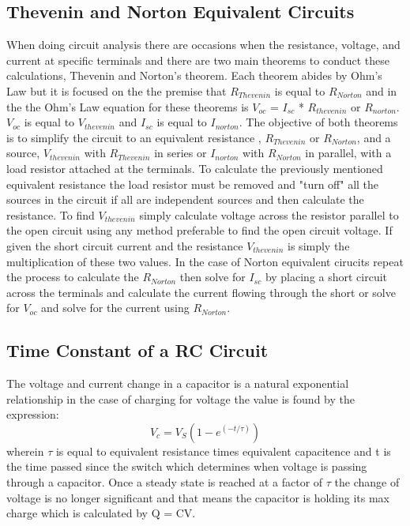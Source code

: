 \documentclass[a4paper]{article}
\begin{document}
\subsection{Thevenin and Norton Equivalent Circuits}
When doing circuit analysis there are occasions when the resistance, voltage, and current at specific terminals and there are two main theorems to conduct these calculations, Thevenin and Norton's theorem. Each theorem abides by Ohm's Law but it is 
focused on the the premise that $R_{Thevenin}$ is equal to $R_{Norton}$ and in the the Ohm's Law equation for these theorems is $V_{oc}$ = $I_{sc}$ * $R_{thevenin}$ or $R_{norton}$. $V_{oc}$ is equal to $V_{thevenin}$ and $I_{sc}$ is equal to $I_{norton}$.
The objective of both theorems is to simplify the circuit to an equivalent resistance , $R_{Thevenin}$ or $R_{Norton}$, and a source, $V_{thevenin}$ with $R_{Thevenin}$ in series or $I_{norton}$ with $R_{Norton}$ in parallel, with a load resistor attached at the terminals. To calculate the previously mentioned equivalent resistance the load resistor must be removed and
"turn off" all the sources in the circuit if all are independent sources and then calculate the resistance. To find $V_{thevenin}$ simply calculate voltage across the resistor parallel to the open circuit using any method preferable to find the open circuit voltage. If given the short circuit current and the resistance $V_{thevenin}$ is simply the multiplication
of these two values. In the case of Norton equivalent cirucits repeat the process to calculate the $R_{Norton}$ then solve for $I_{sc}$ by placing a short circuit across the terminals and calculate the current flowing through the short or solve for $V_{oc}$ and solve for the current using $R_{Norton}$.    

\subsection{Time Constant of a RC Circuit}

The voltage and current change in a capacitor is a natural exponential relationship in the case of charging for voltage the value is found by the expression:
\[V_{c} = V_{S}(1-e^{(-t/\tau)})\]
wherein $\tau$ is equal to equivalent resistance times equivalent capacitence and t is the time passed since the switch which determines when voltage is passing through a capacitor.
Once a steady state is reached at a factor of $\tau$ the change of voltage is no longer significant and that means the capacitor is holding its max charge which is calculated by Q = CV.  
\pagebreak
\end{document}
